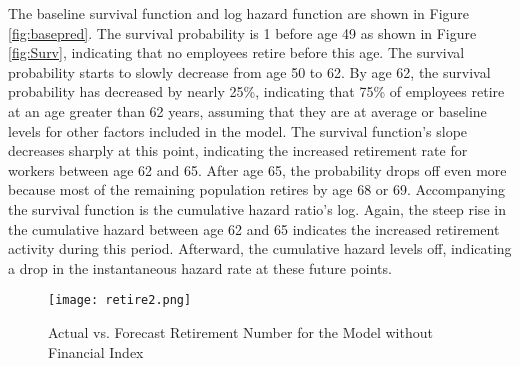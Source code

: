 The baseline survival function and log hazard function are shown in Figure \ref{fig:basepred}. The survival probability is 1 before age 49 as shown in Figure \ref{fig:Surv}, indicating that no employees retire before this age. The survival probability starts to slowly decrease from age 50 to 62. By age 62, the survival probability has decreased by nearly 25\%, indicating that 75\% of employees retire at an age greater than 62 years, assuming that they are at average or baseline levels for other factors included in the model. The survival function's slope decreases sharply at this point, indicating the increased retirement rate for workers between age 62 and 65. After age 65, the probability drops off even more because most of the remaining population retires by age 68 or 69.  Accompanying the survival function is the cumulative hazard ratio's log. Again, the steep rise in the cumulative hazard between age 62 and 65 indicates the increased retirement activity during this period. Afterward, the cumulative hazard levels off, indicating a drop in the instantaneous hazard rate at these future points.
\begin{figure}[h!]
	\centering
	\texttt{[image: retire2.png]}
	\caption{Actual vs. Forecast Retirement Number for the Model without Financial Index}
	\label{fig:predict}	
	
\end{figure}
